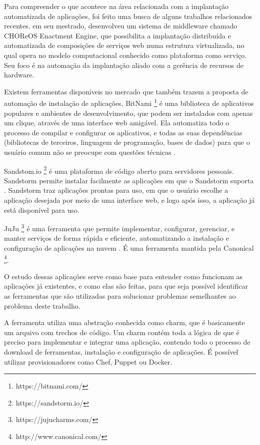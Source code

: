 Para compreender o que acontece na área relacionada com a implantação
automatizada de aplicações, foi feito uma busca de alguns trabalhos relacionados 
recentes.  em seu mestrado,
desenvolveu um sistema de middleware chamado CHOReOS Enactment Engine, que possibilita a implantação distribuída e automatizada de composições
de serviços web numa estrutura virtualizada, no qual opera no modelo
computacional conhecido como plataforma como serviço. Seu foco é na automação da 
implantação aliado com a gerência de recursos de 
hardware.

Existem ferramentas disponíveis no mercado que também trazem a proposta
de automação de instalação de aplicações, BitNami \footnote{https://bitnami.com/} é uma 
biblioteca de aplicativos populares e ambientes de desenvolvimento, 
que podem ser instalados com apenas um clique, 
através de uma interface web amigável. Ela automatiza todo o processo de 
compilar e configurar os aplicativos, 
e todas as suas dependências (bibliotecas de terceiros, linguagem de programação, 
bases de dados) para que o usuário comum não se preocupe com questões técnicas \cite{bitnami}. 

Sandstom.io \footnote{https://sandstorm.io/} é uma plataforma de código aberto para servidores
pessoais. Sandstorm permite instalar
facilmente as aplicações em que o Sandstorm 
suporta \cite{sandstormio}. Sandstorm traz aplicações prontas para uso, 
em que o usuário escolhe a aplicação desejada  por meio de uma interface web, 
e logo após isso, a aplicação já está disponível para uso.

JuJu \footnote{https://jujucharms.com/} é uma ferramenta que permite 
implementar, configurar, gerenciar, 
e manter serviços de forma rápida e eficiente, automatizando a instalação e 
configuração de aplicações na nuvem \cite{juju}. É uma ferramenta mantida pela Canonical \footnote{http://www.canonical.com/}. 

O estudo dessas aplicações serve como base para entender como funcionam as aplicações
já existentes, e como elas são feitas, para que seja possível identificar
as ferramentas que são utilizadas para solucionar problemas semelhantes ao problema deste
trabalho. 

A ferramenta  utiliza uma abstração conhecida como charm,
que é basicamente um arquivo com trechos de código. Um charm
contém toda a lógica de que é preciso para implementar e integrar uma aplicação,
contendo todo o processo de download de ferramentas, instalação e configuração de
aplicações. É possível utilizar provisionadores como Chef, Puppet ou Docker. 

